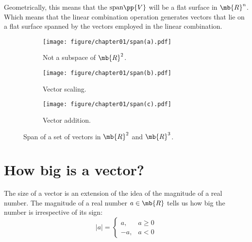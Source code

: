 Geometrically, this means that the $\text{span}\pp{V}$ will be a flat surface in $\mb{R}^n$. Which means that the linear combination operation generates vectors that lie on a flat surface spanned by the vectors employed in the linear combination.

\begin{figure}[h]
    \centering
    \begin{subfigure}[b]{0.32\textwidth}
        \texttt{[image: figure/chapter01/span(a).pdf]}
        \caption{Not a subspace of $\mb{R}^2$.}
        \label{fig:ch01-span1}
    \end{subfigure}
    \begin{subfigure}[b]{0.32\textwidth}
        \centering
        \texttt{[image: figure/chapter01/span(b).pdf]}
        \caption{Vector scaling.}
        \label{fig:ch01-span2}
    \end{subfigure}
    \begin{subfigure}[b]{0.32\textwidth}
        \centering
        \texttt{[image: figure/chapter01/span(c).pdf]}
        \caption{Vector addition.}
        \label{fig:ch01-span3}
    \end{subfigure}
    \caption{Span of a set of vectors in $\mb{R}^2$ and $\mb{R}^3$.}
\end{figure}

\section{How big is a vector?}
The size of a vector is an extension of the idea of the magnitude of a real number. The magnitude of a real number $a \in \mb{R}$ tells us how big the number is irrespective of its sign:
\begin{equation}
    \vert a \vert = \begin{cases} a, & a \geq 0 \\ -a, & a < 0 \end{cases}
    \label{eq:magnitude-real}
\end{equation}

